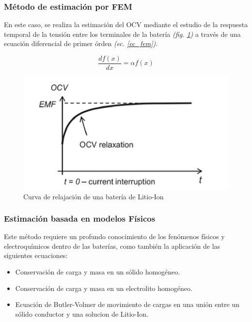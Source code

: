 \documentclass[10pt]{beamer}
\theoremstyle{remark}
\theoremstyle{definition}
\begin{document}
\begin{frame}[allowframebreaks]
  \frametitle{Método de estimación por FEM}

  En este caso, se realiza la estimación del OCV mediante el estudio de la
  respuesta temporal de la tensión entre los terminales de la batería
  \emph{(fig. \ref{fig:relax_emf})} a través
  de una ecuación diferencial de primer órden \emph{(ec. \ref{ec_fem})}.

  \begin{minipage}{0.4\textwidth}
	\centering
	\begin{equation}
	  \frac{df(x)}{dx} = \alpha f(x)
	  \label{ec_fem}
	\end{equation}
  \end{minipage}
  \hspace{10pt}
  \begin{minipage}{0.4\textwidth}
	\begin{figure}[h!]
	  \includegraphics[width=1\textwidth]{images/EMF_relaxation.png}
	  \caption{Curva de relajación de una batería de Litio-Ion}
	  \label{fig:relax_emf}
	\end{figure}
  \end{minipage}

\end{frame}

\begin{frame}[allowframebreaks]
  \frametitle{Estimación basada en modelos Físicos}

  Este método requiere un profundo conocimiento de los fenómenos físicos y
  electroquímicos dentro de las baterías, como también la aplicación de las
  siguientes ecuaciones:

  \begin{itemize}
	\item Conservación de carga y masa en un sólido homogéneo.
	\item Conservación de carga y masa en un electrolito homogéneo.
	\item Ecuación de Butler-Volmer de movimiento de cargas en una unión entre
	  un sólido conductor y una solucion de Litio-Ion.
  \end{itemize}

\end{frame}
\end{document}
